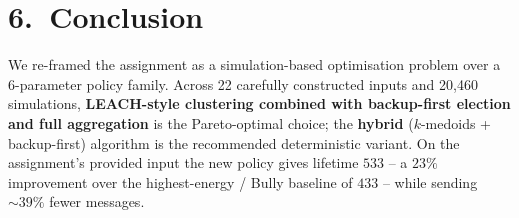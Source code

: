 \documentclass[a4paper,10pt]{article}
\begin{document}
\vspace{-0.6em}
\section*{6.\ Conclusion}
\vspace{-0.4em}
We re-framed the assignment as a simulation-based optimisation problem
over a 6-parameter policy family.  Across 22 carefully constructed
inputs and 20,460 simulations, \textbf{LEACH-style clustering combined
with backup-first election and full aggregation} is the
Pareto-optimal choice; the \textbf{hybrid} ($k$-medoids + backup-first)
algorithm is the recommended deterministic variant.  On the
assignment's provided input the new policy gives lifetime $533$ -- a
$23\%$ improvement over the highest-energy / Bully baseline of
$433$ -- while sending $\sim 39\%$ fewer messages.
\end{document}
